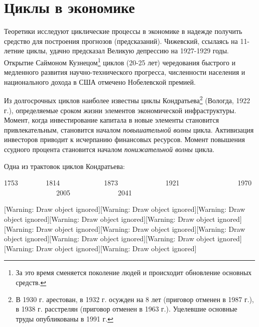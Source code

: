 %
%
\section[Циклы в экономике]{Циклы в экономике}

\bigskip

Теоретики исследуют циклические процессы в экономике в надежде получить средство для построения прогнозов
(предсказаний). Чижевский, ссылаясь на 11-летние циклы, удачно предсказал Великую депрессию на 1927-1929 годы. Открытие
Саймоном Кузнецом\footnote{За это время сменяется поколение людей и происходит обновление основных
средств.} циклов (20-25 лет) чередования быстрого и медленного развития научно-технического прогресса, численности
населения и национального дохода в США отмечено Нобелевской премией.

Из долгосрочных циклов наиболее известны циклы Кондратьева\footnote{В 1930 г. арестован, в 1932 г.
осужден на 8 лет (приговор отменен в 1987 г.), в 1938 г. расстрелян (приговор отменен в 1963 г.). Уцелевшие основные
труды опубликованы в 1991 г.} (Вологда, 1922 г.), определяемые сроком жизни элементов экономической инфраструктуры.
Момент, когда инвестирование капитала в новые элементы становится привлекательным, становится началом
\textit{повышательной волны} цикла. Активизация инвесторов приводит к исчерпанию финансовых ресурсов. Момент повышения
ссудного процента становится началом \textit{понижательной волны} цикла.

Одна из трактовок циклов Кондратьева:


\bigskip

1753\ \  \ \ \ \ \ \ 1814 \ \ \ \ \ \ \ \ \ \ \ \ 1873 \ \ \ \ \ \ \ \ \ \ \ \ \ 1921
\ \ \ \ \ \ \ \ \ \ \ \ \ \ \ \ 1970 \ \ \ \ \ \ \ \ \ \ \ \ \ \ \ 2005 \ \ \ \ \ \ \ \ \ \ \ \ \ 2041

[Warning: Draw object ignored][Warning: Draw object ignored][Warning: Draw object ignored][Warning: Draw object
ignored][Warning: Draw object ignored][Warning: Draw object ignored][Warning: Draw object ignored][Warning: Draw object
ignored][Warning: Draw object ignored][Warning: Draw object ignored][Warning: Draw object ignored][Warning: Draw object
ignored]

